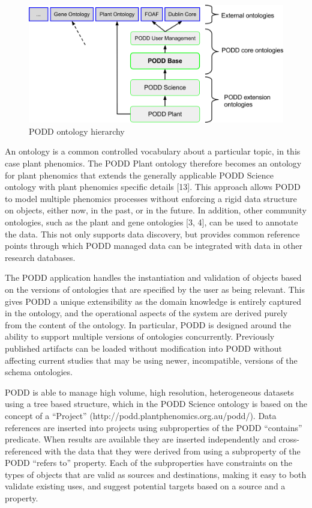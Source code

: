 \documentclass{llncs}
\begin{document}
\begin{figure}
\begin{center}
 \includegraphics[width=12cm,keepaspectratio=true]{podd-ontologies-figure2.png}

\caption{PODD ontology hierarchy}
\label{poddontologies}
\end{center}
\end{figure}


An ontology is a common controlled vocabulary about a particular topic, in this
case plant phenomics. The PODD Plant ontology therefore becomes an ontology for
plant phenomics that extends the generally applicable PODD Science ontology with
plant phenomics specific details [13]. This approach allows PODD to model
multiple phenomics processes without enforcing a rigid data structure on
objects, either now, in the past, or in the future. In addition, other community
ontologies, such as the plant and gene ontologies [3, 4], can be used to
annotate the data. This not only supports data discovery, but provides common
reference points through which PODD managed data can be integrated with data in
other research databases.


The PODD application handles the instantiation and validation of objects based
on the versions of ontologies that are specified by the user as being relevant.
This gives PODD a unique extensibility as the domain knowledge is entirely
captured in the ontology, and the operational aspects of the system are derived
purely from the content of the ontology. In particular, PODD is designed around
the ability to support multiple versions of ontologies concurrently. Previously
published artifacts can be loaded without modification into PODD without
affecting current studies that may be using newer, incompatible, versions of the
schema ontologies.


PODD is able to manage high volume, high resolution, heterogeneous datasets
using a tree based structure, which in the PODD Science ontology is based on the
concept of a ``Project'' (http://podd.plantphenomics.org.au/podd/). Data
references are inserted into projects using subproperties of the PODD
``contains'' predicate. When results are available they are inserted
independently and cross-referenced with the data that they were derived from
using a subproperty of the PODD ``refers to'' property. Each of the
subproperties have constraints on the types of objects that are valid as sources
and destinations, making it easy to both validate existing uses, and suggest
potential targets based on a source and a property.
\end{document}
